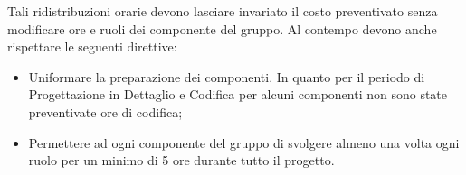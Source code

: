%
Tali ridistribuzioni orarie devono lasciare invariato il costo preventivato senza modificare 
ore e ruoli dei componente del gruppo. Al contempo devono anche rispettare le seguenti direttive:
\begin{itemize}
	\item Uniformare la preparazione dei componenti. In quanto per il periodo di Progettazione in Dettaglio e Codifica per alcuni componenti non sono state preventivate ore di codifica;
	\item Permettere ad ogni componente del gruppo di svolgere almeno una volta ogni ruolo per un minimo di 5 ore durante tutto il progetto. 	
\end{itemize}
